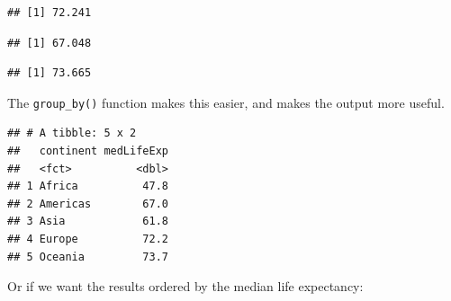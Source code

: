 \documentclass[]{article}
\newenvironment{Shaded}{\begin{snugshade}}{\end{snugshade}}
\newcommand{\KeywordTok}[1]{\textcolor[rgb]{0.13,0.29,0.53}{\textbf{#1}}}
\newcommand{\DataTypeTok}[1]{\textcolor[rgb]{0.13,0.29,0.53}{#1}}
\newcommand{\StringTok}[1]{\textcolor[rgb]{0.31,0.60,0.02}{#1}}
\newcommand{\OperatorTok}[1]{\textcolor[rgb]{0.81,0.36,0.00}{\textbf{#1}}}
\newcommand{\NormalTok}[1]{#1}
\begin{document}
\begin{verbatim}
## [1] 72.241
\end{verbatim}

\begin{Shaded}
\end{Shaded}

\begin{verbatim}
## [1] 67.048
\end{verbatim}

\begin{Shaded}
\end{Shaded}

\begin{verbatim}
## [1] 73.665
\end{verbatim}

The \texttt{group\_by()} function makes this easier, and makes the
output more useful.

\begin{Shaded}
\end{Shaded}

\begin{verbatim}
## # A tibble: 5 x 2
##   continent medLifeExp
##   <fct>          <dbl>
## 1 Africa          47.8
## 2 Americas        67.0
## 3 Asia            61.8
## 4 Europe          72.2
## 5 Oceania         73.7
\end{verbatim}

Or if we want the results ordered by the median life expectancy:

\begin{Shaded}
\end{Shaded}
\end{document}
